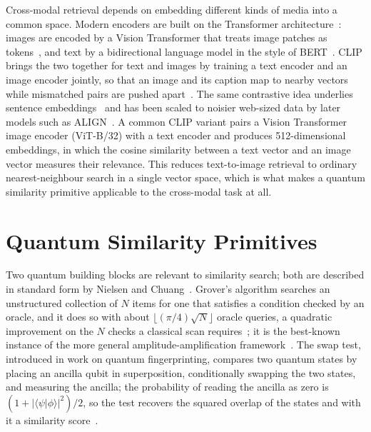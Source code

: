 Cross-modal retrieval depends on embedding different kinds of media into a
common space. Modern encoders are built on the Transformer
architecture~\cite{vaswani2017attention}: images are encoded by a Vision
Transformer that treats image patches as tokens~\cite{dosovitskiy2021vit}, and
text by a bidirectional language model in the style of
BERT~\cite{devlin2019bert}. CLIP brings the two together for text and images by
training a text encoder and an image encoder jointly, so that an image and its
caption map to nearby vectors while mismatched pairs are pushed
apart~\cite{radford2021clip}. The same contrastive idea underlies sentence
embeddings~\cite{reimers2019sentencebert} and has been scaled to noisier
web-sized data by later models such as ALIGN~\cite{jia2021align}. A common CLIP
variant pairs a Vision Transformer image encoder (ViT-B/32) with a text encoder
and produces 512-dimensional embeddings, in which the cosine similarity between a
text vector and an image vector measures their relevance. This reduces
text-to-image retrieval to ordinary nearest-neighbour search in a single vector
space, which is what makes a quantum similarity primitive applicable to the
cross-modal task at all.

\section{Quantum Similarity Primitives}
\label{sec:lit:quantum}


Two quantum building blocks are relevant to similarity search; both are
described in standard form by Nielsen and Chuang~\cite{nielsen2010quantum}.
Grover's algorithm searches an unstructured collection of $N$ items for one that
satisfies a condition checked by an oracle, and it does so with about $\lfloor
(\pi/4)\sqrt{N} \rfloor$ oracle queries, a quadratic improvement on the $N$
checks a classical scan requires~\cite{grover1996}; it is the best-known instance
of the more general amplitude-amplification framework~\cite{brassard2002amplitude}.
The swap test, introduced in work on quantum
fingerprinting, compares two quantum states by placing an ancilla qubit in
superposition, conditionally swapping the two states, and measuring the ancilla;
the probability of reading the ancilla as zero is $(1 + |\langle\psi|\phi\rangle|^2)/2$,
so the test recovers the squared overlap of the states and with it a similarity
score~\cite{buhrman2001swaptest}.

